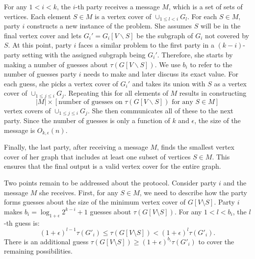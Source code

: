 \documentclass[11pt]{article}
\newcommand{\mvc}[1]{\tau\left(#1 \right)}
\begin{document}
For any $1 < i < k$, the $i$-th party receives a message $M$, which is
a set of sets of vertices. Each element $S \in M$ is a vertex cover of
$\cup_{1 \leq l < i} G_l$. For each $S \in M$, party $i$ constructs a
new instance of the problem. She assumes $S$ will be in the final
vertex cover and lets $G_i' = G_i[V\backslash S]$ be the subgraph of
$G_i$ not covered by $S$. At this point, party $i$ faces a similar
problem to the first party in a $(k-i)$-party setting with the
assigned subgraph being $G_i'$.  Therefore, she starts by making a
number of guesses about $\mvc{G[V\backslash S]}$.  We use $b_i$ to refer to the number of guesses party $i$ needs to make and later discuss its exact value.  For each guess, she
picks a vertex cover of $G_i'$ and takes its union with $S$ as a
vertex cover of $\cup_{1 \leq j \leq i} G_j$. Repeating this for all
elements of $M$ results in constructing \[|M| \times [\text{number of
    guesses on } \mvc{G[V\backslash S]} \text{ for any } S \in M]\]
vertex covers of $\cup_{1 \leq j \leq i} G_j$. She then communicates
all of these to the next party. Since the number of guesses is only a
function of $k$ and $\epsilon$, the size of the message is $O_{k,
  \epsilon}(n)$.

Finally, the last party, after receiving a message $M$, finds the
smallest vertex cover of her graph that includes at least one subset
of vertices $S \in M$. This ensures that the final output is a valid
vertex cover for the entire graph.

Two points remain to be addressed about the protocol. Consider party
$i$ and the message $M$ she receives. First, for any $S \in M$, we
need to describe how the party forms guesses about the size of the
minimum vertex cover of $G[V \setminus S]$. Party $i$ makes $b_i =
\log_{1 + \epsilon}2^{k-i}+1$ guesses about $\mvc{G[V \setminus
    S]}$. For any $1<l<b_i$, the $l$-th guess is: \[ (1 +
\epsilon)^{l-1} \mvc{G'_i} \leq \mvc{G[V \setminus S]} < (1 +
\epsilon)^{l} \mvc{G'_i}.\] 
There is an additional guess
$\mvc{G[V \setminus S]} \geq (1 + \epsilon)^{b_i} \mvc{G'_i}$ to cover
the remaining possibilities.
\end{document}
